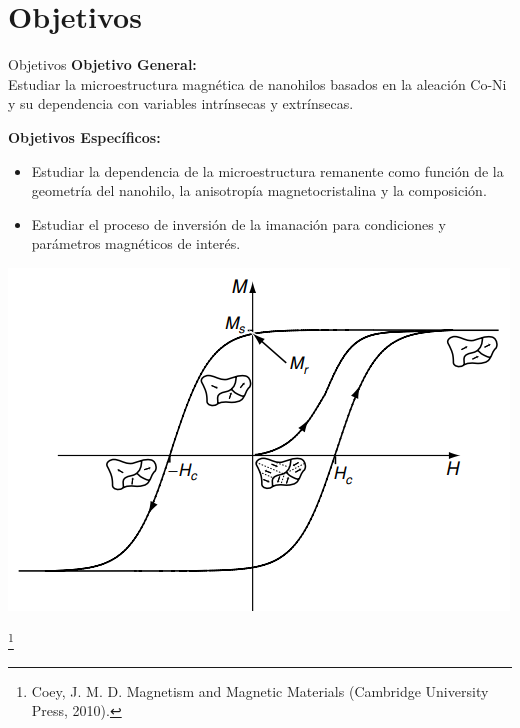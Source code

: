 \documentclass{beamer}
\newcommand\blfootnote[1]{%
  \begingroup
  \renewcommand\thefootnote{}\footnote{#1}%
  \addtocounter{footnote}{-1}%
  \endgroup
}
\begin{document}
\section{Objetivos}
\begin{frame}{Objetivos}
    \scriptsize
    \textbf{Objetivo General:}\\
    
    Estudiar la microestructura magnética de nanohilos basados en la aleación Co-Ni y su dependencia con variables intrínsecas y extrínsecas.

    \medskip
    
    \textbf{Objetivos Específicos:}
    \begin{itemize}
        \item Estudiar la dependencia de la microestructura remanente como función de la geometría del nanohilo, la anisotropía magnetocristalina y la composición.

        \item Estudiar el proceso de inversión de la imanación para condiciones y parámetros magnéticos de interés.
    \end{itemize}

    \centering
    \includegraphics[scale=0.4]{../Figuras/Hysteresis.png}
    
    \blfootnote{{\tiny Coey, J. M. D. Magnetism and Magnetic Materials (Cambridge University Press, 2010).}}
\end{frame}
\end{document}
